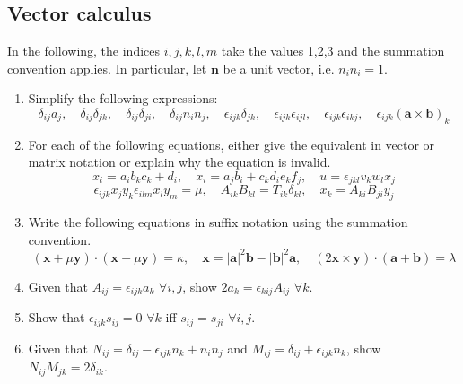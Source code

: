 \documentclass[a4paper]{article}
\begin{document}
\subsection*{Vector calculus}
\begin{qns}
In the following, the indices $i,j,k,l,m$ take the values 1,2,3 and the summation convention applies. In particular, let $\mathbf{n}$ be a unit vector, i.e. $n_in_i=1$.
\begin{enumerate}[label=(\alph*)]
    \item Simplify the following expressions: $$\delta_{ij}a_j,\quad\delta_{ij}\delta_{jk},\quad\delta_{ij}\delta_{ji},\quad\delta_{ij}n_in_j,\quad\epsilon_{ijk}\delta_{jk},\quad\epsilon_{ijk}\epsilon_{ijl},\quad\epsilon_{ijk}\epsilon_{ikj},\quad\epsilon_{ijk}(\mathbf{a}\times\mathbf{b})_k$$
    \item For each of the following equations, either give the equivalent in vector or matrix notation or explain why the equation is invalid.
    $$x_i=a_ib_kc_k+d_i,\quad x_i=a_jb_i+c_kd_ie_kf_j,\quad u=\epsilon_{jkl}v_kw_lx_j$$
    $$\epsilon_{ijk}x_jy_k\epsilon_{ilm}x_ly_m=\mu,\quad A_{ik}B_{kl}=T_{ik}\delta_{kl},\quad x_k=A_{ki} B_{ji}y_j$$
    \item Write the following equations in suffix notation using the summation convention.
    $$(\mathbf{x}+\mu\mathbf{y})\cdot(\mathbf{x}-\mu\mathbf{y})=\kappa,\quad \mathbf{x}=|\mathbf{a}|^2\mathbf{b}-|\mathbf{b}|^2\mathbf{a},\quad (2\mathbf{x}\times\mathbf{y})\cdot(\mathbf{a}+\mathbf{b})=\lambda$$
    \item Given that $A_{ij}=\epsilon_{ijk}a_k$ $\forall i,j$, show $2a_k=\epsilon_{kij}A_{ij}$ $\forall k$.
    \item Show that $\epsilon_{ijk}s_{ij}=0$ $\forall k$ iff $s_{ij}=s_{ji}$ $\forall i,j$.
    \item Given that $N_{ij}=\delta_{ij}-\epsilon_{ijk}n_k+n_in_j$ and $M_{ij}=\delta_{ij}+\epsilon_{ijk}n_k$, show $N_{ij}M_{jk}=2\delta_{ik}$.
\end{enumerate}
\end{qns}
\end{document}
